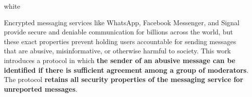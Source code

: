 \documentclass{ali-poster}
\begin{document}
\hspace{\marginwidth}
% 
% 
\begin{panel}{\centerwidth}{white}
	\maketitle

	\vspace{2cm}

	\hfill\parbox{\dimexpr\centerwidth-4cm\relax}{
		\Large
		Encrypted messaging services like WhatsApp, Facebook Messenger, and Signal provide secure and deniable communication for billions across the world, but these exact properties prevent holding users accountable for sending messages that are abusive, misinformative, or otherwise harmful to society.
		This work introduces a protocol in which {\bf\color{highlightcolor} the sender of an abusive message can be identified if there is sufficient agreement among a group of moderators}.
		The protocol {\bf\color{footercolor} retains all security properties of the messaging service for unreported messages}.

	}\hfill\null

	\vspace{2cm}


\end{panel}
\end{document}
